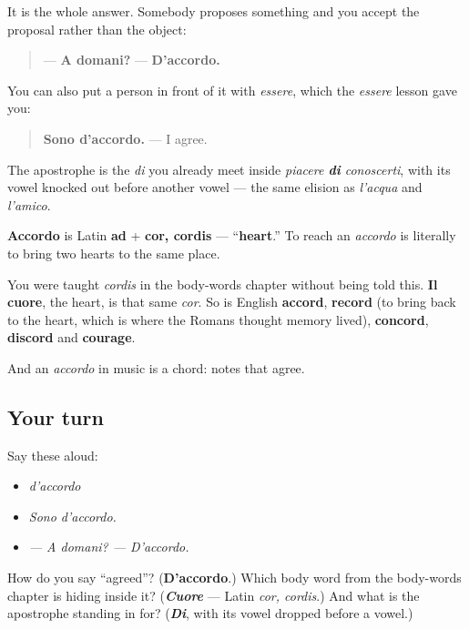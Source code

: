 It is the whole answer. Somebody proposes something and you accept the proposal rather than the object:

\begin{quote}
— \textbf{A domani?} — \textbf{D'accordo.}
\end{quote}

You can also put a person in front of it with \emph{essere}, which the \emph{essere} lesson gave you:

\begin{quote}
\textbf{Sono d'accordo.} — I agree.
\end{quote}

The apostrophe is the \emph{di} you already meet inside \emph{piacere \textbf{di} conoscerti}, with its vowel knocked out before another vowel — the same elision as \emph{l'acqua} and \emph{l'amico}.

\begin{cousinweb}
\textbf{Accordo} is Latin \textbf{ad} + \textbf{cor, cordis} — \textquotedblleft{}\textbf{heart}.\textquotedblright{} To reach an \emph{accordo} is literally to bring two hearts to the same place.

You were taught \emph{cordis} in the body-words chapter without being told this. \textbf{Il cuore}, the heart, is that same \emph{cor}. So is English \textbf{accord}, \textbf{record} (to bring back to the heart, which is where the Romans thought memory lived), \textbf{concord}, \textbf{discord} and \textbf{courage}.

And an \emph{accordo} in music is a chord: notes that agree.
\end{cousinweb}

\subsection*{Your turn}
Say these aloud:

\begin{itemize}
\raggedright
  \item \emph{d'accordo}
  \item \emph{Sono d'accordo.}
  \item \emph{— A domani? — D'accordo.}
\end{itemize}

\begin{tcolorbox}[breakable,colback=teal!4,colframe=teal!35!black,title={Before you move on}]
How do you say \textquotedblleft{}agreed\textquotedblright{}? (\textbf{D'accordo}.) Which body word from the body-words chapter is hiding inside it? (\emph{\textbf{Cuore}} — Latin \emph{cor, cordis}.) And what is the apostrophe standing in for? (\emph{\textbf{Di}}, with its vowel dropped before a vowel.)
\end{tcolorbox}
